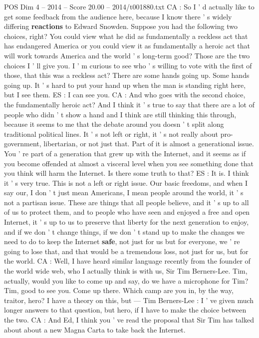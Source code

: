 \begin{textsample}{POS Dim 4 – 2014 – Score 20.00 – 2014/t001880.txt}
CA : So I ' d actually like to get some feedback from the audience here, because I know there ' s widely differing \textbf{reactions} to Edward Snowden.
Suppose you had the following two choices, right?
You could view what he did as fundamentally a reckless act that has endangered America or you could view it as fundamentally a heroic act that will work towards America and the world ' s long-term good?
Those are the two choices I ' ll give you.
I ' m curious to see who ' s willing to vote with the first of those, that this was a reckless act?
There are some hands going up.
Some hands going up.
It ' s hard to put your hand up when the man is standing right here, but I see them.
ES : I can see you.
CA : And who goes with the second choice, the fundamentally heroic act?
And I think it ' s true to say that there are a lot of people who didn ' t show a hand and I think are still thinking this through, because it seems to me that the debate around you doesn ' t split along traditional political lines.
It ' s not left or right, it ' s not really about pro-government, libertarian, or not just that.
Part of it is almost a generational issue.
You ' re part of a generation that grew up with the Internet, and it seems as if you become offended at almost a visceral level when you see something done that you think will harm the Internet.
Is there some truth to that?
ES : It is.
I think it ' s very true.
This is not a left or right issue.
Our basic freedoms, and when I say our, I don ' t just mean Americans, I mean people around the world, it ' s not a partisan issue.
These are things that all people believe, and it ' s up to all of us to protect them, and to people who have seen and enjoyed a free and open Internet, it ' s up to us to preserve that liberty for the next generation to enjoy, and if we don ' t change things, if we don ' t stand up to make the changes we need to do to keep the Internet \textbf{safe}, not just for us but for everyone, we ' re going to lose that, and that would be a tremendous loss, not just for us, but for the world.
CA : Well, I have heard similar language recently from the founder of the world wide web, who I actually think is with us, Sir Tim Berners-Lee.
Tim, actually, would you like to come up and say, do we have a microphone for Tim?
Tim, good to see you.
Come up there.
Which camp are you in, by the way, traitor, hero?
I have a theory on this, but — Tim Berners-Lee : I ' ve given much longer answers to that question, but hero, if I have to make the choice between the two.
CA : And Ed, I think you ' ve read the proposal that Sir Tim has talked about about a new Magna Carta to take back the Internet.

\end{textsample}
